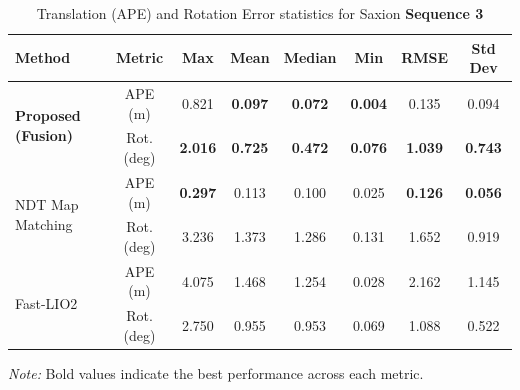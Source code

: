 \begin{table}[H]
	\centering
	\renewcommand{\arraystretch}{0.6}
	\setlength{\tabcolsep}{15pt}
	\caption{Translation (APE) and Rotation Error statistics for Saxion \textbf{Sequence 3} }
	\label{tab:ape_rot_saxion_seq3}
	
	\begin{adjustbox}{width=\textwidth}
		\begin{tabular}{@{}lccccccc@{}}
			\toprule
			\textbf{Method} & \textbf{Metric} & \textbf{Max} & \textbf{Mean} & \textbf{Median} & \textbf{Min} & \textbf{RMSE} & \textbf{Std Dev} \\
			\midrule
			
			\multirow{2}{*}{\textbf{Proposed (Fusion)}} 
			& APE (m)        & 0.821   & \textbf{0.097}   & \textbf{0.072}     & \textbf{0.004}   & 0.135   & 0.094 \\
			& Rot. (deg)     & \textbf{2.016}   & \textbf{0.725}   & \textbf{0.472}     & \textbf{0.076}   & \textbf{1.039}   & \textbf{0.743} \\
			\midrule
			\multirow{2}{*}{NDT Map Matching} 
			& APE (m)        & \textbf{0.297}   & 0.113   & 0.100     & 0.025    & \textbf{0.126}   & \textbf{0.056} \\
			& Rot. (deg)     & 3.236   & 1.373   & 1.286     & 0.131    & 1.652   & 0.919 \\
			\midrule
			\multirow{2}{*}{Fast-LIO2} 
			& APE (m)        & 4.075   & 1.468   & 1.254     & 0.028    & 2.162   & 1.145 \\
			& Rot. (deg)     & 2.750   & 0.955   & 0.953     & 0.069    & 1.088   & 0.522 \\
			\bottomrule
		\end{tabular}
	\end{adjustbox}
{\footnotesize \textit{Note:} Bold values indicate the best performance across each metric.}
\end{table}


